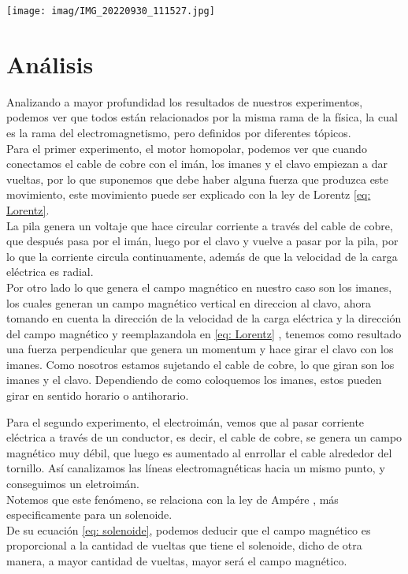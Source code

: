 \documentclass[]{article}
\newenvironment{Figura}
  {\par\medskip\noindent\minipage{\linewidth}}
  {\endminipage\par\medskip}
\begin{document}
\begin{multicols*}{2}
\begin{Figura}
    \centering
    \texttt{[image: imag/IMG\_20220930\_111527.jpg]}
\end{Figura}


    
\section*{Análisis}
Analizando a mayor profundidad los resultados de nuestros experimentos, podemos ver que todos están relacionados por la misma rama de la física, la cual es la rama del electromagnetismo, pero definidos por diferentes tópicos.\\
Para el primer experimento, el motor homopolar, podemos ver que cuando conectamos el cable de cobre con el imán, los imanes y el clavo empiezan a dar vueltas, por lo que suponemos que debe haber alguna fuerza que produzca este movimiento, 
este movimiento puede ser explicado con la ley de Lorentz \eqref{eq: Lorentz}.\\
La pila genera un voltaje que hace circular corriente a través del cable de cobre, que después pasa por el imán, luego por el clavo y vuelve a pasar por la pila, por lo que la corriente circula continuamente, además de que 
la velocidad de la carga eléctrica es radial.\\
 Por otro lado lo que genera el campo magnético en nuestro caso son los imanes, los cuales generan un campo magnético vertical en direccion al clavo, ahora tomando en cuenta la dirección de la velocidad 
de la carga eléctrica y la dirección del campo magnético y reemplazandola en \eqref{eq: Lorentz} , tenemos como resultado una fuerza perpendicular que genera un momentum y hace girar el clavo con los imanes. Como nosotros estamos sujetando el cable 
de cobre, lo que giran son los imanes y el clavo. Dependiendo de como coloquemos los imanes, estos pueden girar en sentido horario o antihorario.\\
\vspace{0.3cm}

Para el segundo experimento, el electroimán, vemos que al pasar corriente eléctrica a través de un conductor, es decir, el cable de cobre, se genera un campo magnético muy débil, que luego es aumentado al enrrollar el cable alrededor del tornillo.  Así canalizamos las líneas electromagnéticas hacia un mismo punto, y conseguimos un eletroimán. \\
Notemos que este fenómeno, se relaciona con la ley de Ampére \cite{Ley-de-Ampere}, más especificamente para un solenoide.\\
De su ecuación \eqref{eq: solenoide}, podemos deducir que el campo magnético es proporcional a la cantidad de vueltas que tiene el solenoide, dicho de otra manera, a mayor cantidad de vueltas,  mayor será el campo magnético. \\ 


\end{multicols*}
\end{document}
